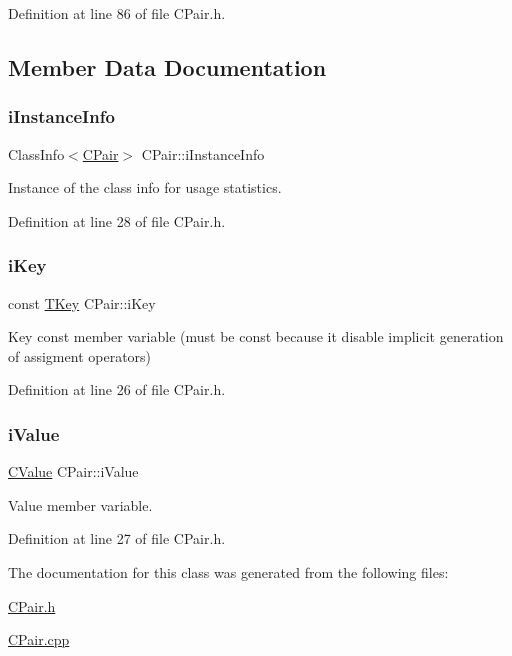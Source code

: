 Definition at line 86 of file C\+Pair.\+h.



\subsection{Member Data Documentation}
\mbox{\label{class_c_pair_a749ff9db1acff63d75aa09ec87d2427a}} 
\subsubsection{\texorpdfstring{i\+Instance\+Info}{iInstanceInfo}}
{\footnotesize\ttfamily Class\+Info$<$\hyperlink{class_c_pair}{C\+Pair}$>$ C\+Pair\+::i\+Instance\+Info\hspace{0.3cm}{\ttfamily [private]}}



Instance of the class info for usage statistics. 



Definition at line 28 of file C\+Pair.\+h.

\mbox{\label{class_c_pair_a37d0dd4585094709d0536f47453a2a38}} 
\subsubsection{\texorpdfstring{i\+Key}{iKey}}
{\footnotesize\ttfamily const \hyperlink{class_c_pair_a9030f3ef2a07301c105bdf17620ae66a}{T\+Key} C\+Pair\+::i\+Key\hspace{0.3cm}{\ttfamily [private]}}



Key const member variable (must be const because it disable implicit generation of assigment operators) 



Definition at line 26 of file C\+Pair.\+h.

\mbox{\label{class_c_pair_a469ab54768d718dd0072d8878fd44611}} 
\subsubsection{\texorpdfstring{i\+Value}{iValue}}
{\footnotesize\ttfamily \hyperlink{class_c_value___t_student_1_1_c_value}{C\+Value} C\+Pair\+::i\+Value\hspace{0.3cm}{\ttfamily [private]}}



Value member variable. 



Definition at line 27 of file C\+Pair.\+h.



The documentation for this class was generated from the following files\+:\begin{DoxyCompactItemize}
\item 
\hyperlink{_c_pair_8h}{C\+Pair.\+h}\item 
\hyperlink{_c_pair_8cpp}{C\+Pair.\+cpp}\end{DoxyCompactItemize}
